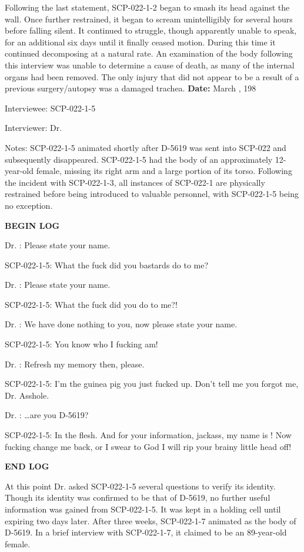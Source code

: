 Following the last statement, SCP-022-1-2 began to smash its head against the wall. Once further restrained, it began to scream unintelligibly for several hours before falling silent. It continued to struggle, though apparently unable to speak, for an additional six days until it finally ceased motion. During this time it continued decomposing at a natural rate. An examination of the body following this interview was unable to determine a cause of death, as many of the internal organs had been removed. The only injury that did not appear to be a result of a previous surgery/autopsy was a damaged trachea.
\newpage
\textbf{Date:} March , 198

Interviewee: SCP-022-1-5

Interviewer: Dr. 

Notes: SCP-022-1-5 animated shortly after D-5619 was sent into SCP-022 and subsequently disappeared. SCP-022-1-5 had the body of an approximately 12-year-old female, missing its right arm and a large portion of its torso. Following the incident with SCP-022-1-3, all instances of SCP-022-1 are physically restrained before being introduced to valuable personnel, with SCP-022-1-5 being no exception.

\begin{boxedminipage}{\textwidth}
\begin{flushleft}
\textbf{\lb BEGIN LOG\rb}

Dr. : Please state your name.

SCP-022-1-5: What the fuck did you bastards do to me?

Dr. : Please state your name.

SCP-022-1-5: What the fuck did you do to me?!

Dr. : We have done nothing to you, now please state your name.

SCP-022-1-5: You know who I fucking am!

Dr. : Refresh my memory then, please.

SCP-022-1-5: I'm the guinea pig you just fucked up. Don't tell me you forgot me, Dr. Asshole.

Dr. : …are you D-5619?

SCP-022-1-5: In the flesh. And for your information, jackass, my name is \redacted! Now fucking change me back, or I swear to God I will rip your brainy little head off!

\textbf{\lb END LOG\rb}
\end{flushleft}
\end{boxedminipage}

At this point Dr.  asked SCP-022-1-5 several questions to verify its identity. Though its identity was confirmed to be that of D-5619, no further useful information was gained from SCP-022-1-5. It was kept in a holding cell until expiring two days later. After three weeks, SCP-022-1-7 animated as the body of D-5619. In a brief interview with SCP-022-1-7, it claimed to be an 89-year-old female.